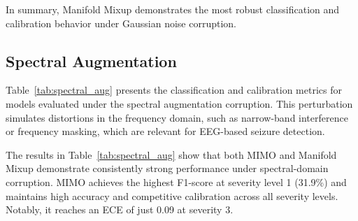 In summary, Manifold Mixup demonstrates the most robust classification and calibration behavior under Gaussian noise corruption.

\subsection{Spectral Augmentation}
\label{subsec:spectral_augmentation}

Table~\ref{tab:spectral_aug} presents the classification and calibration metrics for models evaluated under the spectral augmentation corruption. This perturbation simulates distortions in the frequency domain, such as narrow-band interference or frequency masking, which are relevant for EEG-based seizure detection.

\begin{table}[htbp]
\centering
{}
\caption[Classification and calibration performance under spectral augmentation]{Classification and calibration performance under spectral augmentation corruption at severity levels 1 to 5. S1–S5 denote severity levels.}
\label{tab:spectral_aug}
\end{table}

The results in Table~\ref{tab:spectral_aug} show that both MIMO and Manifold Mixup demonstrate consistently strong performance under spectral-domain corruption. MIMO achieves the highest F1-score at severity level 1 (31.9\%) and maintains high accuracy and competitive calibration across all severity levels. Notably, it reaches an ECE of just 0.09 at severity 3.

